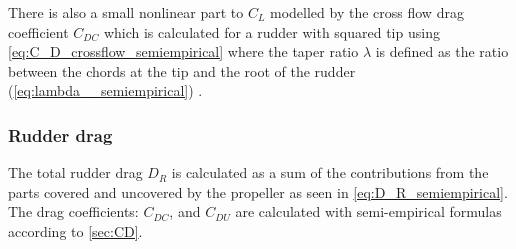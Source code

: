 %
\begin{equation}
    \label{eq:AR_e_semiempirical}
    
\end{equation}
%
\begin{equation}
    \label{eq:AR_g_semiempirical}
    
\end{equation}
%
\begin{equation}
    \label{eq:a_0_semiempirical}
    
\end{equation}
There is also a small nonlinear part to $C_L$ modelled by the cross flow drag coefficient $C_{DC}$ which is calculated for a rudder with squared tip using \autoref{eq:C_D_crossflow_semiempirical} where the taper ratio $\lambda$ is defined as the ratio between the chords at the tip and the root of the rudder (\autoref{eq:lambda__semiempirical}) \citep{hughes_tempest_2011}. 
\begin{equation}
    \label{eq:C_D_crossflow_semiempirical}
    
\end{equation}
%
\begin{equation}
    \label{eq:lambda__semiempirical}
    
\end{equation}
%
%
\subsubsection{Rudder drag}
\label{sec:rudder_drag}
The total rudder drag $D_R$ is calculated as a sum of the contributions from the parts covered and uncovered by the propeller as seen in \autoref{eq:D_R_semiempirical}.
\begin{equation}
    \label{eq:D_R_semiempirical}
    
\end{equation}
The drag coefficients: $C_{DC}$, and $C_{DU}$ are calculated with semi-empirical formulas according to \autoref{sec:CD}.

